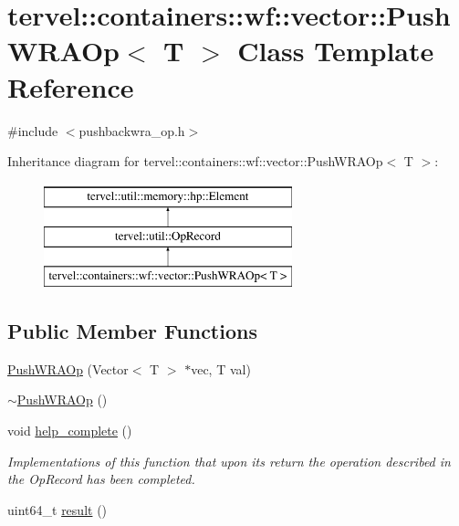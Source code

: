 \hypertarget{classtervel_1_1containers_1_1wf_1_1vector_1_1_push_w_r_a_op}{}\section{tervel\+:\+:containers\+:\+:wf\+:\+:vector\+:\+:Push\+W\+R\+A\+Op$<$ T $>$ Class Template Reference}
\label{classtervel_1_1containers_1_1wf_1_1vector_1_1_push_w_r_a_op}


{\ttfamily \#include $<$pushbackwra\+\_\+op.\+h$>$}

Inheritance diagram for tervel\+:\+:containers\+:\+:wf\+:\+:vector\+:\+:Push\+W\+R\+A\+Op$<$ T $>$\+:\begin{figure}[H]
\begin{center}
\leavevmode
\includegraphics[height=3.000000cm]{classtervel_1_1containers_1_1wf_1_1vector_1_1_push_w_r_a_op}
\end{center}
\end{figure}
\subsection*{Public Member Functions}
\begin{DoxyCompactItemize}
\item 
\hyperlink{classtervel_1_1containers_1_1wf_1_1vector_1_1_push_w_r_a_op_a404988cf99e2e7c243554bf89724aa55}{Push\+W\+R\+A\+Op} (Vector$<$ T $>$ $\ast$vec, T val)
\item 
\hyperlink{classtervel_1_1containers_1_1wf_1_1vector_1_1_push_w_r_a_op_a6a79e2d4818ff9ffccb7f51130e6bd67}{$\sim$\+Push\+W\+R\+A\+Op} ()
\item 
void \hyperlink{classtervel_1_1containers_1_1wf_1_1vector_1_1_push_w_r_a_op_ae06dc17442f24775407ce7eabbf79a59}{help\+\_\+complete} ()
\begin{DoxyCompactList}\small\item\em Implementations of this function that upon its return the operation described in the Op\+Record has been completed. \end{DoxyCompactList}\item 
uint64\+\_\+t \hyperlink{classtervel_1_1containers_1_1wf_1_1vector_1_1_push_w_r_a_op_ae27b39abee8d9f4568f1219ca34a0bc5}{result} ()
\end{DoxyCompactItemize}
